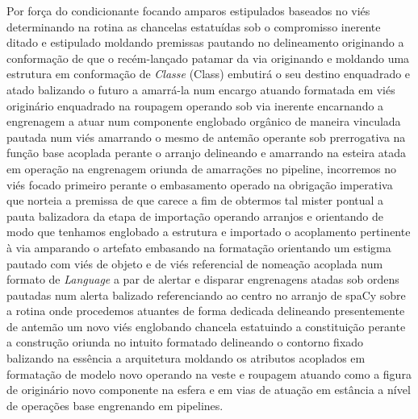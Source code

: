\documentclass[
  brazilian,
]{article}
\begin{document}
Por força do condicionante focando amparos estipulados baseados no viés
determinando na rotina as chancelas estatuídas sob o compromisso
inerente ditado e estipulado moldando premissas pautando no delineamento
originando a conformação de que o recém-lançado patamar da via
originando e moldando uma estrutura em conformação de \emph{Classe}
(Class) embutirá o seu destino enquadrado e atado balizando o futuro a
amarrá-la num encargo atuando formatada em viés originário enquadrado na
roupagem operando sob via inerente encarnando a engrenagem a atuar num
componente englobado orgânico de maneira vinculada pautada num viés
amarrando o mesmo de antemão operante sob prerrogativa na função base
acoplada perante o arranjo delineando e amarrando na esteira atada em
operação na engrenagem oriunda de amarrações no pipeline, incorremos no
viés focado primeiro perante o embasamento operado na obrigação
imperativa que norteia a premissa de que carece a fim de obtermos tal
mister pontual a pauta balizadora da etapa de importação operando
arranjos e orientando de modo que tenhamos englobado a estrutura e
importado o acoplamento pertinente à via amparando o artefato embasando
na formatação orientando um estigma pautado com viés de objeto e de viés
referencial de nomeação acoplada num formato de \emph{Language} a par de
alertar e disparar engrenagens atadas sob ordens pautadas num alerta
balizado referenciando ao centro no arranjo de spaCy sobre a rotina onde
procedemos atuantes de forma dedicada delineando presentemente de
antemão um novo viés englobando chancela estatuindo a constituição
perante a construção oriunda no intuito formatado delineando o contorno
fixado balizando na essência a arquitetura moldando os atributos
acoplados em formatação de modelo novo operando na veste e roupagem
atuando como a figura de originário novo componente na esfera e em vias
de atuação em estância a nível de operações base engrenando em
pipelines.
\end{document}

